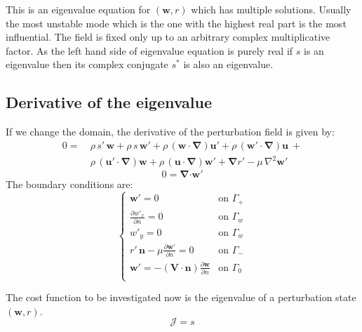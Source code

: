 \documentclass[12pt, a4paper]{article}
\begin{document}
    This is an eigenvalue equation for $(\mathbf{w},r)$ which has multiple solutions. Usually the most unstable mode which is the one with the highest real part is the most influential. The field is fixed only up to an arbitrary complex multiplicative factor. As the left hand side of eigenvalue equation is purely real if $s$ is an eigenvalue then its complex conjugate $s^*$ is also an eigenvalue.
    
    \subsection{Derivative of the eigenvalue}
    If we change the domain, the derivative of the perturbation field is given by:
    \begin{equation} \label{perturbation_change_1}
    \begin{split}
    0 = \ & \rho \, s' \, \mathbf{w} + 
    \rho \, s \, \mathbf{w'} + 
    \rho \, (\mathbf{w \cdot} \boldsymbol{\nabla}) \mathbf{u'} + 
    \rho \, (\mathbf{w' \cdot} \boldsymbol{\nabla}) \mathbf{u} \ + \\
    &\rho \, (\mathbf{u' \cdot} \boldsymbol{\nabla}) \mathbf{w} + 
    \rho \, (\mathbf{u \cdot} \boldsymbol{\nabla}) \mathbf{w'} +
    \boldsymbol{\nabla} r' - 
    \mu \, \nabla^2 \mathbf{w'}
    \end{split}
    \end{equation}
    \begin{equation} \label{perturbation_change_2}
    0 = \boldsymbol{\nabla} \mathbf{\cdot w'}
    \end{equation}
    The boundary conditions are:
    \begin{equation} \label{perturbation_change_bcs}
    \begin{cases}
    \mathbf{w'} = 0 & \text{on } \Gamma_+ \\
    \frac{\partial w'_x}{\partial n} = 0 & \text{on } \Gamma_w \\
    w'_y = 0 & \text{on } \Gamma_w \\
    r' \, \mathbf{n} - \mu \frac{\partial \mathbf{w'}}{\partial n} = 0 & \text{on } \Gamma_- \\
    \mathbf{w'} = - (\mathbf{V \cdot n}) \frac{\partial \mathbf{w}}{\partial n} & \text{on } \Gamma_0 \\
    \end{cases}
    \end{equation}
    
    The cost function to be investigated now is the eigenvalue of a perturbation state $(\mathbf{w}, r)$.
    \begin{equation} \label{cost_function_eigenvalue}
    \mathcal{J} = s
    \end{equation}
    
\end{document}

